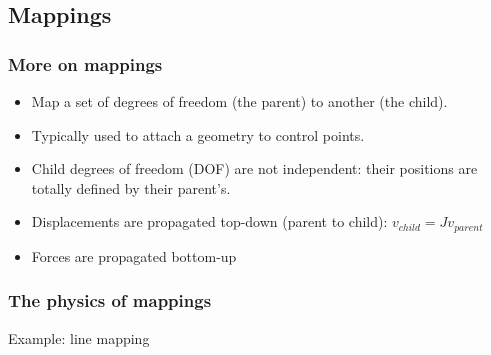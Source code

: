 \documentclass[a4paper,compress]{beamer}
\begin{document}
\subsection{Mappings}

\begin{frame}
\frametitle{More on mappings}
\begin{itemize}
 \item Map a set of degrees of freedom (the parent) to another (the child).
 \item Typically used to attach a geometry to control points.
 \item Child degrees of freedom (DOF) are not independent: their positions are totally defined by their parent's.
 \item Displacements are propagated top-down (parent to child): $v_{child} = Jv_{parent}$
 \item Forces are propagated bottom-up
\end{itemize}

\end{frame}


\begin{frame}
\frametitle{The physics of mappings}
Example: line mapping


\end{frame}
\end{document}
